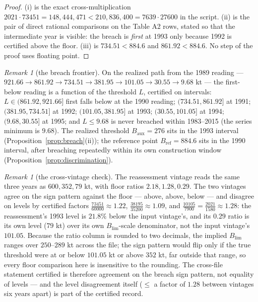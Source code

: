 \documentclass[10pt,twocolumn]{article}
\theoremstyle{plain}
\theoremstyle{remark}
\newtheorem{remark}[theorem]{Remark}
\begin{document}
\begin{proof}
(i) is the exact cross-multiplication
\(2021 \cdot 73451 = 148{,}444{,}471 < 210{,}836{,}400 = 7639 \cdot
27600\) in the script. (ii) is the pair of direct rational comparisons
on the Table A2 rows, stated so that the intermediate year is visible:
the breach is \emph{first} at 1993 only because 1992 is certified
above the floor. (iii) is \(734.51 < 884.6\) and \(861.92 < 884.6\).
No step of the proof uses floating point.
\end{proof}

\begin{remark}[the breach frontier]\label{rem:frontier}
On the realized path from the 1989 reading --- \(921.66 \to 861.92 \to
734.51 \to 381.95 \to 101.05 \to 30.55 \to 9.68\) kt --- the
first-below reading is a function of the threshold \(L\), certified on
intervals: \(L \in (861.92, 921.66]\) first falls below at the 1990
reading; \((734.51, 861.92]\) at 1991; \((381.95, 734.51]\) at 1992;
\((101.05, 381.95]\) at 1993; \((30.55, 101.05]\) at 1994;
\((9.68, 30.55]\) at 1995; and \(L \le 9.68\) is never breached within
1983--2015 (the series minimum is \(9.68\)). The realized threshold
\(B_{\mathrm{aux}} = 276\) sits in the 1993 interval
(Proposition~\ref{prop:breach}(ii)); the reference point
\(B_{\mathrm{ref}} = 884.6\) sits in the 1990 interval, after breaching
repeatedly within its own construction window
(Proposition~\ref{prop:discrimination}).
\end{remark}

\begin{remark}[the cross-vintage check]\label{rem:xtevintage}
The reassessment vintage reads the same three years as
\(600, 352, 79\) kt, with floor ratios \(2.18, 1.28, 0.29\). The two
vintages agree on the sign pattern against the floor --- above, above,
below --- and disagree on levels by certified factors
\(\tfrac{73451}{60000} \approx 1.22\),
\(\tfrac{38195}{35200} \approx 1.09\), and
\(\tfrac{10105}{7900} = \tfrac{2021}{1580} \approx 1.28\): the
reassessment's 1993 level is \(21.8\%\) below the input vintage's, and
its \(0.29\) ratio is its own level (\(79\) kt) over its own
\(B_{\mathrm{lim}}\)-scale denominator, not the input vintage's
\(101.05\). Because the ratio column is rounded to two decimals, the
implied \(B_{\mathrm{lim}}\) ranges over \(250\)--\(289\) kt across
the file; the sign pattern would flip only if the true threshold were
at or below \(101.05\) kt or above \(352\) kt, far outside that range,
so every floor comparison here is insensitive to the rounding. The
cross-file statement certified is therefore agreement on the breach
sign pattern, not equality of levels --- and the level disagreement
itself (\(\le\) a factor of \(1.28\) between vintages six years
apart) is part of the certified record.
\end{remark}
\end{document}
